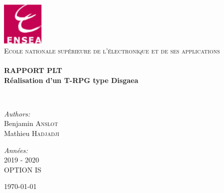 \begin{titlepage}
\begin{center}

\includegraphics[width=0.15\textwidth]{./images/logo-ensea.png}~\\[1cm]

\textsc{\Large  Ecole nationale supérieure de l'électronique et de ses applications}\\[0.5cm]

\HRule \\[0.4cm]

{\huge \bfseries RAPPORT PLT\\
Réalisation d'un T-RPG type Disgaea   \\[0.4cm] }

\HRule \\[1.5cm]

\begin{minipage}{0.4\textwidth}
\begin{flushleft} \large
\emph{Authors:}\\
Benjamin \textsc{Anslot}\\
Mathieu \textsc{Hadjadji}
\end{flushleft}
\end{minipage}
\begin{minipage}{0.4\textwidth}
\begin{flushright} \large


\emph{Années:} \\
2019 - 2020 \\
OPTION IS \\
\end{flushright}
\end{minipage}

\vfill

{\large \today}

\end{center}
\end{titlepage}